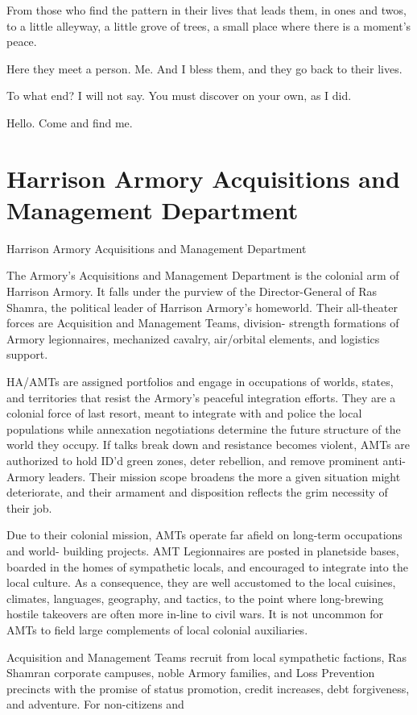 From those who find the pattern in their lives that leads them, in ones and twos, to a little  
alleyway, a little grove of trees, a small place where there is a moment’s peace.   

Here they meet a person. Me. And I bless them, and they go back to their lives.   

To what end? I will not say. You must discover on your own, as I did.    

Hello. Come and find me.    
\section{Harrison Armory Acquisitions and Management Department}
Harrison Armory Acquisitions and Management Department  

The Armory’s Acquisitions and Management Department is the colonial arm of Harrison Armory.  
It falls under the purview of the Director-General of Ras Shamra, the political leader of Harrison  
Armory’s homeworld. Their all-theater forces are Acquisition and Management Teams, division- 
strength formations of Armory legionnaires, mechanized cavalry, air/orbital elements, and  
logistics support.
 

HA/AMTs are assigned portfolios and engage in occupations of worlds, states, and territories  
that resist the Armory’s peaceful integration efforts. They are a colonial force of last resort, meant  
to integrate with and police the local populations while annexation negotiations determine the  
future structure of the world they occupy. If talks break down and resistance becomes violent,  
AMTs are authorized to hold ID’d green zones, deter rebellion, and remove prominent anti- 
Armory leaders. Their mission scope broadens the more a given situation might deteriorate, and  
their armament and disposition reflects the grim necessity of their job.  
 

Due to their colonial mission, AMTs operate far afield on long-term occupations and world- 
building projects. AMT Legionnaires are posted in planetside bases, boarded in the homes of  
sympathetic locals, and encouraged to integrate into the local culture. As a consequence, they  
are well accustomed to the local cuisines, climates, languages, geography, and tactics, to the  
point where long-brewing hostile takeovers are often more in-line to civil wars. It is not  
uncommon for AMTs to field large complements of local colonial auxiliaries.
 

Acquisition and Management Teams recruit from local sympathetic factions, Ras Shamran  
corporate campuses, noble Armory families, and Loss Prevention precincts with the promise of  
status promotion, credit increases, debt forgiveness, and adventure. For non-citizens and  

